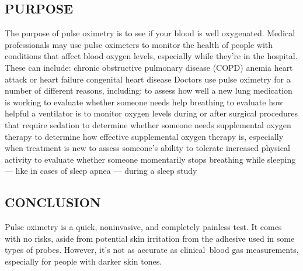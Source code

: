 \documentclass[12pt]{article}
\begin{document}
\subsection{PURPOSE}
The purpose of pulse oximetry is to see if your blood is well oxygenated.
Medical professionals may use pulse oximeters to monitor the health of people with conditions that affect blood oxygen levels, especially while they’re in the hospital.
These can include:
chronic obstructive pulmonary disease (COPD)
anemia
heart attack or heart failure
congenital heart disease
Doctors use pulse oximetry for a number of different reasons, including:
to assess how well a new lung medication is working
to evaluate whether someone needs help breathing
to evaluate how helpful a ventilator is
to monitor oxygen levels during or after surgical procedures that require sedation
to determine whether someone needs supplemental oxygen therapy
to determine how effective supplemental oxygen therapy is, especially when treatment is new
to assess someone’s ability to tolerate increased physical activity
to evaluate whether someone momentarily stops breathing while sleeping — like in cases of sleep apnea — during a sleep study

\subsection{CONCLUSION}
Pulse oximetry is a quick, noninvasive, and completely painless test. It comes with no risks, aside from potential skin irritation from the adhesive used in some types of probes.
However, it’s not as accurate as clinical blood gas measurements, especially for people with darker skin tones.
\end{document}
